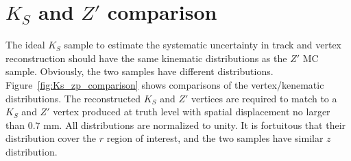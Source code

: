 \section{\texorpdfstring{$K_{S}$}{Ks} and \texorpdfstring{$Z'$}{Z'} comparison}
\label{app:syst_Ks_Zp}

The ideal $K_{S}$ sample to estimate the systematic uncertainty in track and vertex reconstruction should have the same kinematic distributions as the $Z'$ MC sample. Obviously, the two samples have different distributions. Figure~\ref{fig:Ks_zp_comparison} shows comparisons of the vertex/kenematic distributions. The reconstructed $K_{S}$ and $Z'$ vertices are required to match to a $K_{S}$ and $Z'$ vertex produced at truth level with spatial displacement no larger than $0.7$ mm. All distributions are normalized to unity. It is fortuitous that their distribution cover the $r$ region of interest, and the two samples have similar $z$ distribution.



